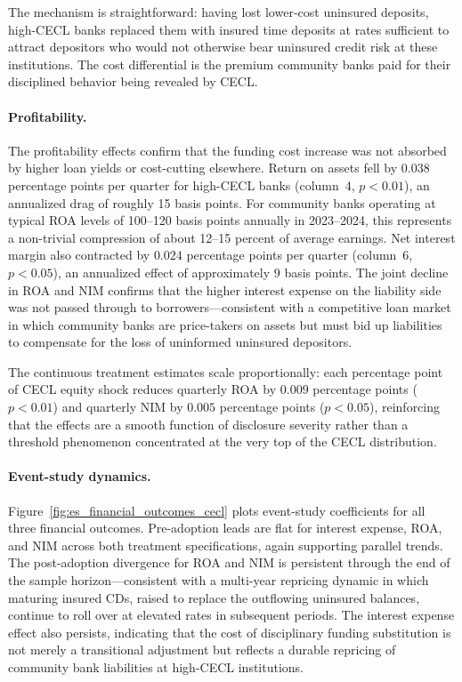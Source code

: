 The mechanism is straightforward: having lost lower-cost uninsured deposits,
high-CECL banks replaced them with insured time deposits at rates sufficient to
attract depositors who would not otherwise bear uninsured credit risk at these
institutions. The cost differential is the premium community banks paid for their
disciplined behavior being revealed by CECL.

\paragraph{Profitability.}
The profitability effects confirm that the funding cost increase was not absorbed
by higher loan yields or cost-cutting elsewhere. Return on assets fell by $0.038$
percentage points per quarter for high-CECL banks (column~4, $p < 0.01$), an
annualized drag of roughly 15 basis points. For community banks operating at
typical ROA levels of 100--120 basis points annually in 2023--2024, this
represents a non-trivial compression of about 12--15 percent of average earnings.
Net interest margin also contracted by $0.024$ percentage points per quarter
(column~6, $p < 0.05$), an annualized effect of approximately 9 basis points.
The joint decline in ROA and NIM confirms that the higher interest expense on
the liability side was not passed through to borrowers—consistent with a
competitive loan market in which community banks are price-takers on assets but
must bid up liabilities to compensate for the loss of uninformed uninsured
depositors.

The continuous treatment estimates scale proportionally: each percentage point of
CECL equity shock reduces quarterly ROA by $0.009$ percentage points ($p < 0.01$)
and quarterly NIM by $0.005$ percentage points ($p < 0.05$), reinforcing that
the effects are a smooth function of disclosure severity rather than a threshold
phenomenon concentrated at the very top of the CECL distribution.

\paragraph{Event-study dynamics.}
Figure~\ref{fig:es_financial_outcomes_cecl} plots event-study coefficients for
all three financial outcomes. Pre-adoption leads are flat for interest expense,
ROA, and NIM across both treatment specifications, again supporting parallel
trends. The post-adoption divergence for ROA and NIM is persistent through the
end of the sample horizon—consistent with a multi-year repricing dynamic in
which maturing insured CDs, raised to replace the outflowing uninsured balances,
continue to roll over at elevated rates in subsequent periods. The interest
expense effect also persists, indicating that the cost of disciplinary funding
substitution is not merely a transitional adjustment but reflects a durable
repricing of community bank liabilities at high-CECL institutions.

